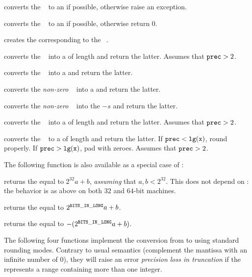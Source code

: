  converts the ~ to an  if
possible, otherwise raise an exception.

 converts the ~ to an
 if possible, otherwise return $0$.

 creates the  corresponding to the
~.

 converts the ~ into a
 of length  and return the latter. Assumes that
${\tt prec} > 2$.

 converts the ~ into a 
and return the latter.

 converts the \emph{non-zero} ~
into a  and return the latter.

 converts the \emph{non-zero} ~
into the  $-s$ and return the latter.

 converts the ~ into a
 of length  and return the latter. Assumes that
${\tt prec} > 2$.

 converts the ~ to a
 of length  and return the latter. If
${\tt prec} < {\tt lg(x)}$, round properly. If ${\tt prec} > {\tt lg(x)}$,
pad with zeroes. Assumes that ${\tt prec} > 2$.

\noindent The following function is also available as a special case of
:

 returns the  equal to $2^{32} a +
b$, \emph{assuming} that $a,b < 2^{32}$. This does not depend on
: the behavior is as above on both $32$ and $64$-bit
machines.

 returns the  equal to
$2^{{\tt BITS\_IN\_LONG}} a + b$.

 returns the  equal to
$-(2^{{\tt BITS\_IN\_LONG}} a + b)$.

The following four functions implement the conversion from  to
 using standard rounding modes. Contrary to usual semantics
(complement the mantissa with an infinite number of 0), they will raise an
error \emph{precision loss in truncation} if the  represents a
range containing more than one integer.


